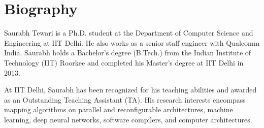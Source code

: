 \chapter*{Biography}

{Saurabh Tewari} is a Ph.D. student at the Department of Computer Science and Engineering at IIT Delhi. He also works as a senior staff engineer with Qualcomm India. Saurabh holds a Bachelor's degree (B.Tech.) from the Indian Institute of Technology (IIT) Roorkee and completed his Master's degree at IIT Delhi in 2013.

At IIT Delhi, Saurabh has been recognized for his teaching abilities and awarded as an Outstanding Teaching Assistant (TA). His research interests encompass mapping algorithms on parallel and reconfigurable architectures, machine learning, deep neural networks, software compilers, and computer architectures.